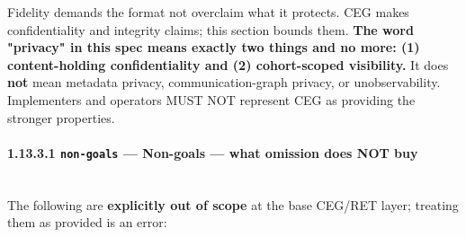 \documentclass[11pt]{article}
\begin{document}
Fidelity demands the format not overclaim what it protects. CEG makes confidentiality and integrity claims; this section bounds them. \textbf{The word "privacy" in this spec means exactly two things and no more: (1) content-holding confidentiality and (2) cohort-scoped visibility.} It does \textbf{not} mean metadata privacy, communication-graph privacy, or unobservability. Implementers and operators MUST NOT represent CEG as providing the stronger properties.


\paragraph{1.13.3.1 \texttt{non-goals} — Non-goals — what omission does NOT buy}\mbox{}\\


The following are \textbf{explicitly out of scope} at the base CEG/RET layer; treating them as provided is an error:
\end{document}
